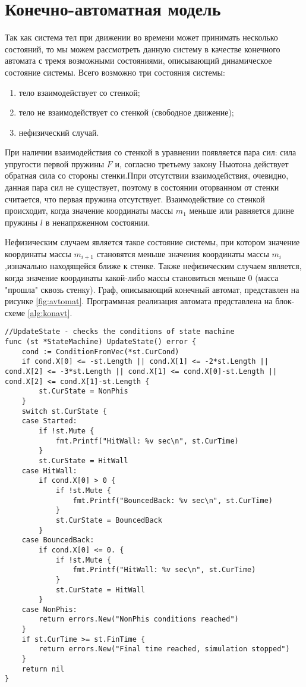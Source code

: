 \section{Конечно-автоматная модель}

 Так как система тел при движении во времени может принимать несколько состояний, то мы можем рассмотреть данную систему в качестве  конечного автомата с тремя возможными состояниями, описывающий динамическое состояние системы. Всего возможно три состояния системы:
\begin{enumerate}
	\item тело взаимодействует со стенкой;
	\item тело не взаимодействует со стенкой (свободное движение);
	\item нефизический случай.
\end{enumerate}

При наличии взаимодействия со стенкой в уравнении появляется пара сил: сила упругости первой пружины $F$ и, согласно третьему закону Ньютона действует обратная сила со стороны стенки.Ппри отсутствии взаимодействия, очевидно, данная пара сил не существует, поэтому в состоянии оторванном от стенки считается, что первая пружина отсутствует. Взаимодействие со стенкой происходит, когда значение координаты массы $m_1$ меньше или равняется длине пружины  $l$ в ненапряженном состоянии.

 Нефизическим случаем является такое состояние системы, при котором значение координаты массы $m_{i+1}$ становятся меньше значения координаты массы $m_i$,изначально находящейся ближе к стенке. Также нефизическим случаем является, когда значение координаты какой-либо массы становиться меньше 0 (масса "прошла" сквозь стенку). Граф, описывающий конечный автомат, представлен на рисунке 
 \ref{fig:avtomat}. Программная реализация автомата представлена на блок-схеме \ref{alg:konavt}.



\begin{lstlisting}[numbers=none,label=lst:konavt,language=Golang, caption=Программная реализация конечного автомата]
	//UpdateState - checks the conditions of state machine
func (st *StateMachine) UpdateState() error {
	cond := ConditionFromVec(*st.CurCond)
	if cond.X[0] <= -st.Length || cond.X[1] <= -2*st.Length || cond.X[2] <= -3*st.Length || cond.X[1] <= cond.X[0]-st.Length || cond.X[2] <= cond.X[1]-st.Length {
		st.CurState = NonPhis
	}
	switch st.CurState {
	case Started:
		if !st.Mute {
			fmt.Printf("HitWall: %v sec\n", st.CurTime)
		}
		st.CurState = HitWall
	case HitWall:
		if cond.X[0] > 0 {
			if !st.Mute {
				fmt.Printf("BouncedBack: %v sec\n", st.CurTime)
			}
			st.CurState = BouncedBack
		}
	case BouncedBack:
		if cond.X[0] <= 0. {
			if !st.Mute {
				fmt.Printf("HitWall: %v sec\n", st.CurTime)
			}
			st.CurState = HitWall
		}
	case NonPhis:
		return errors.New("NonPhis conditions reached")
	}
	if st.CurTime >= st.FinTime {
		return errors.New("Final time reached, simulation stopped")
	}
	return nil
}
\end{lstlisting}

